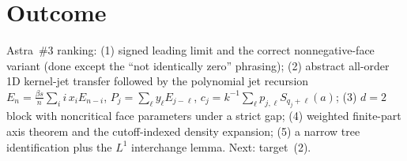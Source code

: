 \documentclass[11pt]{article}
\begin{document}
\section{Outcome}
Astra~\#3 ranking: (1) signed leading limit and the correct nonnegative-face variant (done except the
``not identically zero'' phrasing); (2) abstract all-order 1D kernel-jet transfer followed by the
polynomial jet recursion $E_n=\frac{\beta s}{n}\sum_i i\,x_iE_{n-i}$, $P_j=\sum_\ell y_\ell E_{j-\ell}$,
$c_j=k^{-1}\sum_\ell p_{j,\ell}S_{q_j+\ell}(a)$; (3) $d=2$ block with noncritical face parameters under a
strict gap; (4) weighted finite-part axis theorem and the cutoff-indexed density expansion; (5) a
narrow tree identification plus the $L^1$ interchange lemma. Next: target~(2).
\end{document}
